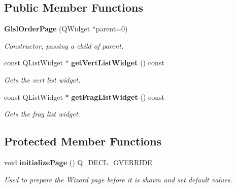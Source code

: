 \subsection*{Public Member Functions}
\begin{DoxyCompactItemize}
\item 
{\bf Glsl\-Order\-Page} (Q\-Widget $\ast$parent=0)
\begin{DoxyCompactList}\small\item\em Constructor, passing a child of parent. \end{DoxyCompactList}\item 
const Q\-List\-Widget $\ast$ {\bf get\-Vert\-List\-Widget} () const 
\begin{DoxyCompactList}\small\item\em Gets the vert list widget. \end{DoxyCompactList}\item 
const Q\-List\-Widget $\ast$ {\bf get\-Frag\-List\-Widget} () const 
\begin{DoxyCompactList}\small\item\em Gets the frag list widget. \end{DoxyCompactList}\end{DoxyCompactItemize}
\subsection*{Protected Member Functions}
\begin{DoxyCompactItemize}
\item 
void {\bf initialize\-Page} () Q\-\_\-\-D\-E\-C\-L\-\_\-\-O\-V\-E\-R\-R\-I\-D\-E
\begin{DoxyCompactList}\small\item\em Used to prepare the Wizard page before it is shown and set default values. \end{DoxyCompactList}\end{DoxyCompactItemize}
